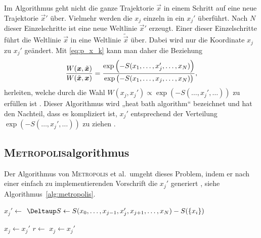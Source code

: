 Im Algorithmus geht nicht die ganze Trajektorie $\vec x$ in einem Schritt auf
eine neue Trajektorie $\vec x'$ über. Vielmehr werden die $x_j$ einzeln in ein
$x_j'$ überführt. Nach $N$ dieser Einzelschritte ist eine neue Weltlinie $\vec
x'$ erzeugt. Einer dieser Einzelschritte führt die Weltlinie $\vec x$ in eine
Weltlinie $\tilde{\vec x}$ über. Dabei wird nur die Koordinate $x_j$ zu $x_j'$
geändert. Mit \eqref{eq:p_x_k} kann man daher die Beziehung
\parencite[(3.25)]{Creutz/Statistical_Approach_QM}
\[
    \frac{W(\vec x, \tilde{\vec x})}{W(\tilde{\vec x}, \vec x)}
    = \frac{\exp\del{-S(x_1, \ldots, x_j', \ldots, x_N)}}{\exp\del{-S(x_1, \ldots, x_j,
    \ldots, x_N)}},
\]
herleiten, welche durch die Wahl $W(x_j, x_j') \propto \exp(-S(\ldots, x_j',
\ldots))$ zu erfüllen ist \parencite[(3.27)]{Creutz/Statistical_Approach_QM}.
Dieser Algorithmus wird „heat bath algorithm“ bezeichnet und hat den Nachteil,
dass es kompliziert ist, $x_j'$ entsprechend der Verteilung $\exp(-S(\ldots,
x_j', \ldots))$ zu ziehen \parencite[438]{Creutz/Statistical_Approach_QM}.

\subsection{\textsc{Metropolis}algorithmus}

Der Algorithmus von \textsc{Metropolis} et al.\ umgeht dieses Problem, indem er
nach einer einfach zu implementierenden Vorschrift die $x_j'$ generiert
\parencite[439]{Creutz/Statistical_Approach_QM}, siehe
Algorithmus~\ref{alg:metropolis}.

\begin{algorithm}
    \begin{algorithmic}
            \State $x_j' \gets$ 
            \State $\Deltaup S \gets S(x_0, \ldots, x_{j-1}, x_j',
            x_{j+1}, \ldots, x_\timesites) - S(\{x_i\})$

                \State $x_j \gets x_j'$
            \Else
                \State $r \gets$ 
                    \State $x_j \gets x_j'$
                \EndIf
            \EndIf
        \EndFor
    \end{algorithmic}
    \caption{%
        \textsc{Metropolis}algorithmus. Die Funktion $\textsc{Zufallzahl}(a,
        b)$ erzeugt eine Zufallszahl im Intervall $(a, b)$.
    }
    \label{alg:metropolis}
\end{algorithm}

